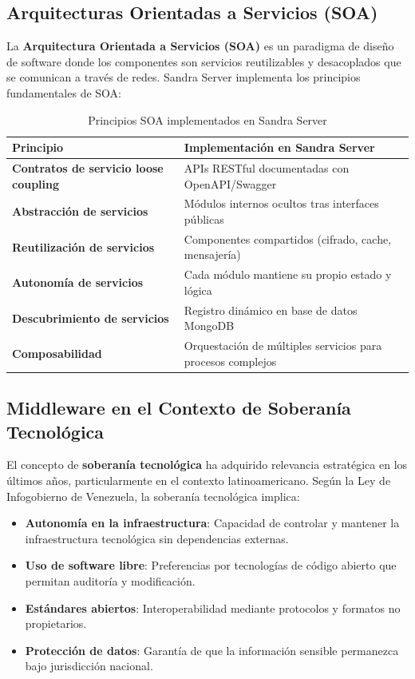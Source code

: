 \subsection{Arquitecturas Orientadas a Servicios (SOA)}

La \textbf{Arquitectura Orientada a Servicios (SOA)} es un paradigma de diseño de software donde los componentes son servicios reutilizables y desacoplados que se comunican a través de redes. Sandra Server implementa los principios fundamentales de SOA:

\begin{table}[H]
\centering
\caption{Principios SOA implementados en Sandra Server}
\begin{tabular}{|l|p{10cm}|}
\hline
\textbf{Principio} & \textbf{Implementación en Sandra Server} \\ \hline
\textbf{Contratos de servicio loose coupling} & APIs RESTful documentadas con OpenAPI/Swagger \\ \hline
\textbf{Abstracción de servicios} & Módulos internos ocultos tras interfaces públicas \\ \hline
\textbf{Reutilización de servicios} & Componentes compartidos (cifrado, cache, mensajería) \\ \hline
\textbf{Autonomía de servicios} & Cada módulo mantiene su propio estado y lógica \\ \hline
\textbf{Descubrimiento de servicios} & Registro dinámico en base de datos MongoDB \\ \hline
\textbf{Composabilidad} & Orquestación de múltiples servicios para procesos complejos \\ \hline
\end{tabular}
\end{table}

\subsection{Middleware en el Contexto de Soberanía Tecnológica}

El concepto de \textbf{soberanía tecnológica} ha adquirido relevancia estratégica en los últimos años, particularmente en el contexto latinoamericano. Según la Ley de Infogobierno de Venezuela, la soberanía tecnológica implica:

\begin{itemize}
\item \textbf{Autonomía en la infraestructura}: Capacidad de controlar y mantener la infraestructura tecnológica sin dependencias externas.
\item \textbf{Uso de software libre}: Preferencias por tecnologías de código abierto que permitan auditoría y modificación.
\item \textbf{Estándares abiertos}: Interoperabilidad mediante protocolos y formatos no propietarios.
\item \textbf{Protección de datos}: Garantía de que la información sensible permanezca bajo jurisdicción nacional.
\end{itemize}

